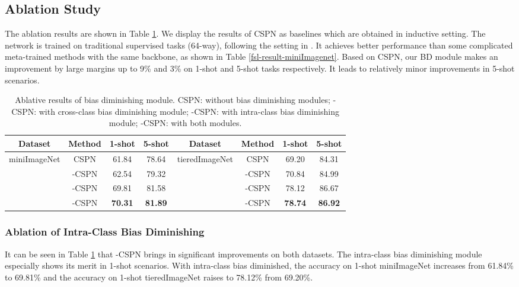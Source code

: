 \documentclass[runningheads]{llncs}
\begin{document}
\subsection{Ablation Study}
The ablation results are shown in Table \ref{ablation-bias-results}.
We display the results of CSPN as baselines which are obtained in inductive setting. The network is trained on traditional supervised tasks (64-way), following the setting in \cite{gidaris2018dynamic,gidaris2019boosting}. It achieves better performance than some complicated meta-trained methods \cite{qiao2018few,rusu2019meta} with the same backbone, as shown in Table \ref{fsl-result-miniImagenet}. Based on CSPN, our BD module makes an improvement by large margins up to 9\% and 3\% on 1-shot and 5-shot tasks respectively. It leads to relatively minor improvements in 5-shot scenarios.

\begin{table}
\small
\centering
\caption{Ablative results of bias diminishing module. CSPN: without bias diminishing modules; -CSPN: with cross-class bias diminishing module; -CSPN: with intra-class bias diminishing module; -CSPN: with both modules.}
\begin{tabular}{cccccccc}
\hline
Dataset &  Method & 1-shot & 5-shot & Dataset &  Method & 1-shot & 5-shot \\ 
\hline
\multirow{4}{*}{miniImageNet} & CSPN & 61.84 & 78.64 & \multirow{4}{*}{tieredImageNet} & CSPN & 69.20 & 84.31  \\
& -CSPN & 62.54 & 79.32 & & -CSPN & 70.84 & 84.99 \\
& -CSPN & 69.81 & 81.58 & & -CSPN & 78.12 & 86.67\\
& -CSPN & \textbf{70.31} & \textbf{81.89} & & -CSPN & \textbf{78.74} & \textbf{86.92}   \\
\hline
\end{tabular} 
\label{ablation-bias-results}
\end{table}




\subsubsection{Ablation of Intra-Class Bias Diminishing}
It can be seen in Table \ref{ablation-bias-results} that -CSPN brings in significant improvements on both datasets. The intra-class bias diminishing module especially shows its merit in 1-shot scenarios. With intra-class bias diminished, the accuracy on 1-shot miniImageNet increases from 61.84\% to 69.81\% and the accuracy on 1-shot tieredImageNet raises to 78.12\% from 69.20\%.
\end{document}
